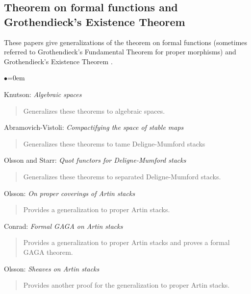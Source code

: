 \subsection{Theorem on formal functions and Grothendieck's Existence Theorem}
\label{subsection-theorem-formal-functions}

\noindent
These papers give generalizations of the theorem on formal functions
\cite[III.4.1.5]{EGA} (sometimes referred to Grothendieck's Fundamental
Theorem for proper morphisms) and Grothendieck's Existence
Theorem \cite[III.5.1.4]{EGA}.
\begin{list}{$\bullet$}{\leftmargin=0em}
\item Knutson:  \emph{Algebraic spaces} \cite[Chapter V]{knutson}
\begin{quote}
Generalizes these theorems to algebraic spaces.
\end{quote}
\smallskip

\item Abramovich-Vistoli: \emph{Compactifying the space of stable maps}
\cite[A.1.1]{abramovich-vistoli}
\begin{quote}
Generalizes these theorems to tame Deligne-Mumford stacks
\end{quote}
\smallskip

\item Olsson and Starr:  \emph{Quot functors for Deligne-Mumford stacks}
\cite{olsson-starr}
\begin{quote}
Generalizes these theorems to separated Deligne-Mumford stacks.
\end{quote}
\smallskip
\item Olsson: \emph{On proper coverings of Artin stacks}
\cite{olsson_proper}
\begin{quote} 
Provides a generalization to proper Artin stacks.
\end{quote}
\smallskip

\item Conrad: \emph{Formal GAGA on Artin stacks} \cite{conrad_gaga}
\begin{quote}
Provides a generalization to proper Artin stacks and proves a formal
GAGA theorem.
\end{quote}
\smallskip

\item Olsson: \emph{Sheaves on Artin stacks} \cite{olsson_sheaves}
\begin{quote}
Provides another proof for the generalization to proper Artin stacks. 
\end{quote}
\end{list}


